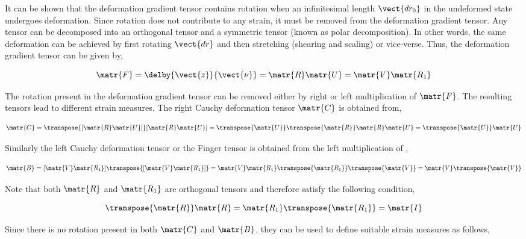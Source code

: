 It can be shown that the deformation gradient tensor contains rotation when an
infinitesimal length $\vect{dr_{0}}$ in the undeformed state undergoes
deformation. Since rotation does not contribute to any strain, it must be
removed from the deformation gradient tensor. Any tensor can be decomposed
into an orthogonal tensor and a symmetric tensor (known as polar
decomposition). In other words, the same deformation can be achieved by first
rotating $\vect{dr}$ and then stretching (shearing and scaling) or
vice-verse. Thus, the deformation gradient tensor can be given by,

\begin{equation}
  \matr{F}=\delby{\vect{z}}{\vect{\nu}}=\matr{R}\matr{U}=\matr{V}\matr{R_{1}}
  \label{eqn:polardecomposition}
\end{equation}
 
The rotation present in the deformation gradient tensor can be removed either
by right or left multiplication of $\matr{F}$. The resulting tensors lead to
different strain measures. The right Cauchy deformation tensor $\matr{C}$ is
obtained from,

\begin{equation}
  \matr{C}=\transpose{[\matr{R}\matr{U}]}[\matr{R}\matr{U}]=\transpose{\matr{U}}\transpose{\matr{R}}\matr{R}\matr{U}=\transpose{\matr{U}}\matr{U}
  \label{eqn:rightCauchy}
\end{equation}

Similarly the left Cauchy deformation tensor or the Finger tensor  is
obtained from the left multiplication of ,

\begin{equation}
  \matr{B}=[\matr{V}\matr{R_{1}}]\transpose{[\matr{V}\matr{R_{1}}]}=\matr{V}\matr{R_{1}}\transpose{\matr{R_{1}}}\transpose{\matr{V}}=\matr{V}\transpose{\matr{V}}
  \label{eqn:leftCauchy}
\end{equation}

\noindent Note that both $\matr{R}$ and $\matr{R_{1}}$ are orthogonal tensors
and therefore satisfy the following condition,

\begin{equation}
  \transpose{\matr{R}}\matr{R}=\matr{R_{1}}\transpose{\matr{R_{1}}}=\matr{I}
  \label{eqn:orthoganality}
\end{equation}

Since there is no rotation present in both $\matr{C}$ and $\matr{B}$, they can
be used to define suitable strain measures as follows,

